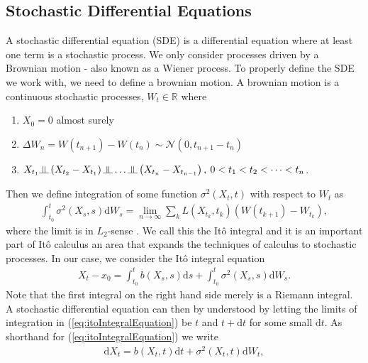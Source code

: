 \subsection{Stochastic Differential Equations}
A stochastic differential equation (SDE) is a differential equation where at least one term is a stochastic process. We only consider processes driven by a Brownian motion - also known as a Wiener process. To properly define the SDE we work with, we need to define a brownian motion. A brownian motion is a continuous stochastic processes, $W_t\in\mathbb{R}$ where
\begin{enumerate}
    \item $X_0 = 0$ almost surely
    \item $\Delta W_n = W\left(t_{n + 1}\right) - W\left(t_{n}\right)\sim\mathcal{N}\left(0, t_{n + 1} - t_{n}\right)$
    \item $X_{t_1}\indep \left(X_{t_2} - X_{t_1}\right)\indep \dots \indep \left(X_{t_n} - X_{t_{n - 1}}\right), \: 0 < t_1 < t_2 < \dots < t_n$.
\end{enumerate}
Then we define integration of some function $\sigma^2(X_t, t)$ with respect to $W_t$ as
\begin{align}
    \int_{t_0}^t \sigma^2(X_s, s) \mathrm{d}W_s = \lim_{n \to \infty}\sum_k L\left(X_{t_k}, t_k\right)\left(W(t_{k + 1}) - W_{t_k}\right),
\end{align}
where the limit is in $L_2$-sense \cite[equation 4.6]{Srkk2019}. We call this the Itô integral and it is an important part of Itô calculus an area that expands the techniques of calculus to stochastic processes. In our case, we consider the Itô integral equation
\begin{align}
    X_t - x_0 = \int_{t_0}^t b(X_s, s)\mathrm{d}s + \int_{t_0}^t \sigma^2(X_s, s)\mathrm{d}W_s. \label{eq:itoIntegralEquation}
\end{align}
Note that the first integral on the right hand side merely is a Riemann integral. A stochastic differential equation can then by understood by letting the limits of integration in (\ref{eq:itoIntegralEquation}) be $t$ and $t+\mathrm{d}t$ for some small $\mathrm{d}t$. As shorthand for (\ref{eq:itoIntegralEquation}) we write
\begin{align}
    \mathrm{d}X_t = b(X_t, t)\mathrm{d}t + \sigma^2(X_t, t)\mathrm{d}W_t \label{eq:firstSDE},
\end{align}
